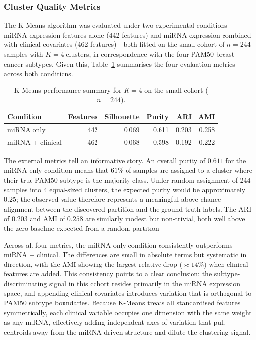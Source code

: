 \subsubsection{Cluster Quality Metrics}

The K-Means algorithm was evaluated under two experimental conditions - miRNA expression
features alone (442 features) and miRNA expression combined with clinical covariates (462
features) - both fitted on the small cohort of $n = 244$ samples with $K = 4$ clusters, in
correspondence with the four PAM50 breast cancer subtypes. Given this, 
Table~\ref{tab:kmeans_summary} summarises the four evaluation metrics across both conditions.

\begin{table}[!ht]
\centering
\caption{K-Means performance summary for $K = 4$ on the small cohort ($n = 244$).}
\label{tab:kmeans_summary}
\begin{tabular}{lrrrrr}
\hline
\textbf{Condition} & \textbf{Features} & \textbf{Silhouette} & \textbf{Purity} & \textbf{ARI} & \textbf{AMI} \\
\hline
miRNA only          & 442 & 0.069 & 0.611 & 0.203 & 0.258 \\
miRNA + clinical    & 462 & 0.068 & 0.598 & 0.192 & 0.222 \\
\hline
\end{tabular}
\end{table}

The external metrics tell an informative story. An overall purity of $0.611$ for the
miRNA-only condition means that $61\%$ of samples are assigned to a cluster where their
true PAM50 subtype is the majority class. Under random assignment of 244 samples into 4
equal-sized clusters, the expected purity would be approximately $0.25$; the observed
value therefore represents a meaningful above-chance alignment between the discovered
partition and the ground-truth labels. The ARI of $0.203$ and AMI of $0.258$ are
similarly modest but non-trivial, both well above the zero baseline expected from a
random partition.

Across all four metrics, the miRNA-only condition consistently outperforms miRNA +
clinical. The differences are small in absolute terms but systematic in direction, with
the AMI showing the largest relative drop ($\approx 14\%$) when clinical features are
added. This consistency points to a clear conclusion: the subtype-discriminating signal
in this cohort resides primarily in the miRNA expression space, and appending clinical
covariates introduces variation that is orthogonal to PAM50 subtype boundaries. Because
K-Means treats all standardised features symmetrically, each clinical variable occupies
one dimension with the same weight as any miRNA, effectively adding independent axes of
variation that pull centroids away from the miRNA-driven structure and dilute the
clustering signal.

